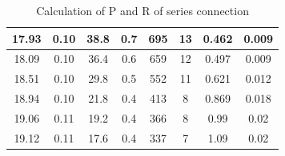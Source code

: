 \documentclass[12pt,a4paper]{article}
\begin{document}
\begin{table}[H]
\begin{tabular}{|c|c|c|c|c|c|c|c|}
    17.93    & 0.10  & 38.8      & 0.7 & 695  & 13  & 0.462  & 0.009  \\ \hline
    18.09    & 0.10  & 36.4      & 0.6 & 659  & 12  & 0.497  & 0.009  \\ \hline
    18.51    & 0.10  & 29.8      & 0.5 & 552  & 11  & 0.621  & 0.012  \\ \hline
    18.94    & 0.10  & 21.8      & 0.4 & 413  & 8   & 0.869  & 0.018  \\ \hline
    19.06    & 0.11  & 19.2      & 0.4 & 366  & 8   & 0.99   & 0.02   \\ \hline
    19.12    & 0.11  & 17.6      & 0.4 & 337  & 7   & 1.09   & 0.02   \\ \hline
    \end{tabular}
    \caption{Calculation of P and R of series connection}
\end{table}
\end{document}
